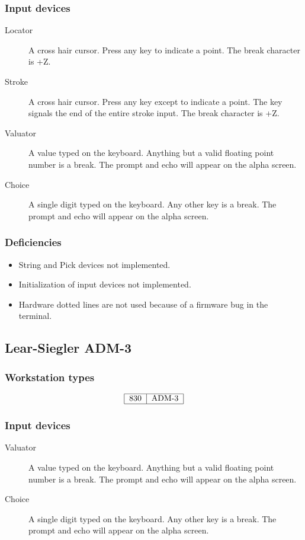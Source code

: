 \subsubsection{Input devices}
\begin{description}
\item[Locator] A cross hair cursor.
Press any key to indicate a point.
The break character is +Z.
\item[Stroke] A cross hair cursor.
Press any key except  to indicate a point.
The  key signals the end of the entire stroke input.
The break character is +Z.
\item[Valuator] A value typed on the keyboard.
Anything but a valid floating point number is a break.
The prompt and echo will appear on the alpha screen.
\item[Choice] A single digit typed on the keyboard.
Any other key is a break.
The prompt and echo will appear on the alpha screen.
\end{description}

\subsubsection{Deficiencies}
\begin{itemize}
\item String and Pick devices not implemented.
\item Initialization of input devices not implemented.
\item Hardware dotted lines are not used because of a firmware bug in the
terminal.
\end{itemize}

\subsection{Lear-Siegler ADM-3}
\label{admgt}
\subsubsection{Workstation types}
\[\begin{tabular}{|l|l|}\hline
830 &ADM-3\\\hline
\end{tabular}\]

\subsubsection{Input devices}
\begin{description}
\item [Valuator] A value typed on the keyboard.
Anything but a valid floating point number is a break.
The prompt and echo will appear on the alpha screen.
\item[Choice] A single digit typed on the keyboard.
Any other key is a break.
The prompt and echo will appear on the alpha screen.
\end{description}

